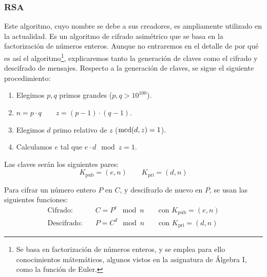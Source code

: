 \subsubsection{\acrshort{RSA}}
Este algoritmo, cuyo nombre se debe a sus creadores, es ampliamente utilizado en la actualidad. Es un algoritmo de cifrado asimétrico que se basa en la factorización de números enteros.
Aunque no entraremos en el detalle de por qué es así el algoritmo\footnote{Se basa en factorización de números enteros, y se emplea para ello conocimientos mátemáticos, algunos vistos en la asignatura de Álgebra I, como la función de Euler.}, explicaremos tanto la generación de claves como el cifrado y descifrado de mensajes. Respecto a la generación de claves, se sigue el siguiente procedimiento:
\begin{enumerate}
    \item Elegimos $p,q$ primos grandes ($p,q>10^{100}$).
    \item $n = p\cdot q\qquad z = (p-1)\cdot(q-1)$.
    \item Elegimos $d$ primo relativo de $z$ ($\operatorname{mcd}(d,z)=1$).
    \item Calculamos $e$ tal que $e\cdot d \mod z = 1$.
\end{enumerate}
Las claves serán los siguientes pares:
\begin{equation*}
    K_{\text{pub}} = (e,n)\qquad K_{\text{pri}} = (d,n)
\end{equation*}

Para cifrar un número entero $P$ en $C$, y descifrarlo de nuevo en $P$, se usan las siguientes funciones:
\begin{align*}
    \text{Cifrado:} &\quad C = P^e \mod n\qquad \text{con } K_{\text{pub}} = (e,n)\\
    \text{Descifrado:} &\quad P = C^d \mod n \qquad \text{con } K_{\text{pri}} = (d,n)
\end{align*}

